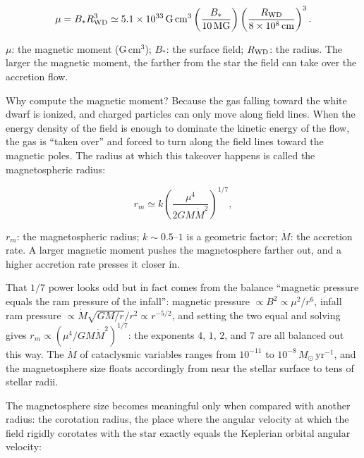 \begin{equation}
  \mu = B_* R_{\rm WD}^3
  \simeq 5.1\times10^{33}\,\mathrm{G\,cm^3}
  \left(\frac{B_*}{10\,\mathrm{MG}}\right)
  \left(\frac{R_{\rm WD}}{8\times10^8\,\mathrm{cm}}\right)^3 .
  \label{eq:e18-mu}
\end{equation}
\begin{formulaexplain}
\(\mu\): the magnetic moment (\(\mathrm{G\,cm^3}\)); \(B_*\): the surface field; \(R_{\rm WD}\): the radius. The larger the magnetic moment, the farther from the star the field can take over the accretion flow.
\end{formulaexplain}

Why compute the magnetic moment? Because the gas falling toward the white dwarf is ionized, and charged particles can only move along field lines. When the energy density of the field is enough to dominate the kinetic energy of the flow, the gas is ``taken over'' and forced to turn along the field lines toward the magnetic poles. The radius at which this takeover happens is called the magnetospheric radius:

\begin{equation}
  r_m \simeq k
  \left(\frac{\mu^4}{2GM\dot M^2}\right)^{1/7},
  \label{eq:e18-rm}
\end{equation}
\begin{formulaexplain}
\(r_m\): the magnetospheric radius; \(k\sim0.5\)--\(1\) is a geometric factor; \(\dot M\): the accretion rate. A larger magnetic moment pushes the magnetosphere farther out, and a higher accretion rate presses it closer in.
\end{formulaexplain}

That \(1/7\) power looks odd but in fact comes from the balance ``magnetic pressure equals the ram pressure of the infall'': magnetic pressure \(\propto B^2\propto\mu^2/r^6\), infall ram pressure \(\propto\dot M\sqrt{GM/r}/r^2\propto r^{-5/2}\), and setting the two equal and solving gives \(r_m\propto(\mu^4/GM\dot M^2)^{1/7}\): the exponents \(4\), \(1\), \(2\), and \(7\) are all balanced out this way. The \(\dot M\) of cataclysmic variables ranges from \(10^{-11}\) to \(10^{-8}\,M_\odot\,\mathrm{yr^{-1}}\), and the magnetosphere size floats accordingly from near the stellar surface to tens of stellar radii.

The magnetosphere size becomes meaningful only when compared with another radius: the corotation radius, the place where the angular velocity at which the field rigidly corotates with the star exactly equals the Keplerian orbital angular velocity:

